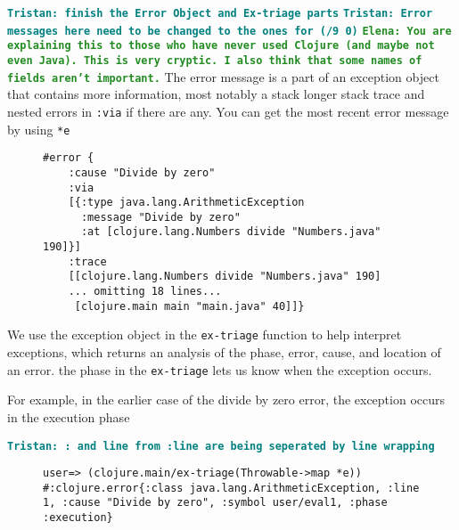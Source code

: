 \documentclass[12pt]{article}
\newcommand{\comment}[1]{{\bf \tt  {#1}}}
\newcommand{\emcomment}[1]{\textcolor{ForestGreen}{\comment{Elena: {#1}}}}
\newcommand{\tkcomment}[1]{\textcolor{Teal}{\comment{Tristan: {#1}}}}
\begin{document}
	\tkcomment{finish the Error Object and Ex-triage parts}
	\tkcomment{Error messages here need to be changed to the ones for (/9 0)}
\emcomment{You are explaining this to those who have never used Clojure (and maybe not even Java). This is very cryptic. I also think that some names of fields aren't important.}
	The error message is a part of an exception object that contains more information,
	most notably a stack longer stack trace and nested errors in \texttt{:via} if there are any. You can get the most recent error message by using \texttt{*e}
	\begin{figure}[h]
		\centering
		\begin{lstlisting}[breaklines=true, basicstyle=\ttfamily]
#error {
	:cause "Divide by zero"
	:via
	[{:type java.lang.ArithmeticException
	  :message "Divide by zero"
	  :at [clojure.lang.Numbers divide "Numbers.java" 190]}]
	:trace
	[[clojure.lang.Numbers divide "Numbers.java" 190]
	... omitting 18 lines...
	 [clojure.main main "main.java" 40]]}

		\end{lstlisting}
	\end{figure}
	

	We use the exception object in the \texttt{ex-triage} function to help interpret exceptions, which returns an analysis of the phase, error, cause, and location of an error.
	 the phase in the \texttt{ex-triage} lets us know when the exception occurs.
	
	For example, in the earlier case of the divide by zero error, the exception occurs in the execution phase

	\tkcomment{: and line from :line are being seperated by line wrapping}

	\begin{figure}[h]
		\centering
		\begin{lstlisting}[breaklines=true, basicstyle=\ttfamily]
user=> (clojure.main/ex-triage(Throwable->map *e))
#:clojure.error{:class java.lang.ArithmeticException, :line 1, :cause "Divide by zero", :symbol user/eval1, :phase :execution}
		\end{lstlisting}
	\end{figure}
\end{document}
